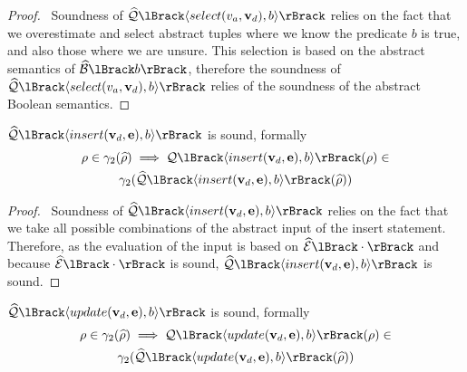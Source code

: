 \begin{proof}
    \pfsketch\
    Soundness of $\abssqlsem{\langle select(v_a, \mathbf{v}_d), b \rangle}$ relies on the fact that we overestimate and select abstract tuples where we know the predicate $b$ is true, and also those where we are unsure.
    This selection is based on the abstract semantics of $\absboolsem{b}$, therefore the soundness of $\abssqlsem{\langle select(v_a, \mathbf{v}_d), b \rangle}$ relies of the soundness of the abstract Boolean semantics.
\end{proof}


\begin{conjecture}
    \label{thm:sound-insert}
    $\abssqlsem{\langle insert(\mathbf{v}_d, \mathbf{e}), b \rangle}$ is sound, formally
    \begin{multline*}
        \environment \in \concrete_2(\ab{\environment}) \implies \sqlsem{\langle insert(\mathbf{v}_d, \mathbf{e}), b \rangle}(\environment) \in \\
        \concrete_2(\abssqlsem{\langle insert(\mathbf{v}_d, \mathbf{e}), b \rangle}(\ab{\environment}))
    \end{multline*}

\end{conjecture}


\begin{proof}
    \pfsketch\
    Soundness of $\abssqlsem{\langle insert(\mathbf{v}_d, \mathbf{e}), b \rangle}$ relies on the fact that we take all possible combinations of the abstract input of the insert statement.
    Therefore, as the evaluation of the input is based on $\absexpsem{\cdot}$ and because $\absexpsem{\cdot}$ is sound, $\abssqlsem{\langle insert(\mathbf{v}_d, \mathbf{e}), b \rangle}$ is sound.
\end{proof}


\begin{conjecture}
    \label{thm:sound-update}
    $\abssqlsem{\langle update(\absattrs, \absexps), b \rangle}$ is sound, formally
    \begin{multline*}
        \environment \in \concrete_2(\ab{\environment}) \implies \sqlsem{\langle update(\absattrs, \absexps), b \rangle}(\environment) \in \\
        \concrete_2(\abssqlsem{\langle update(\absattrs, \absexps), b \rangle}(\ab{\environment}))
    \end{multline*}
\end{conjecture}


